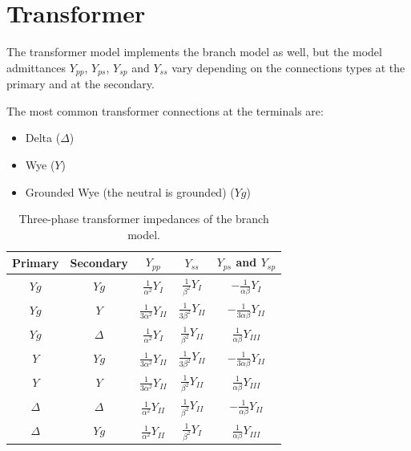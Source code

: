 \documentclass{tufte-book}
\begin{document}
\newpage
\section{Transformer}

The transformer model implements the branch model as well, but the model admittances $Y_{pp}$, $Y_{ps}$, $Y_{sp}$ and $Y_{ss}$ vary depending on the connections types at the primary and at the secondary.

The most common transformer connections at the terminals are:

\begin{itemize}
\item Delta ($\Delta$)
\item Wye ($Y$)
\item Grounded Wye (the neutral is grounded) ($Yg$)
\end{itemize}




\begin{table}[h!]
\begin{center}
\begin{tabular}{ccccc}
\toprule
Primary & Secondary & $Y_{pp}$  & $Y_{ss}$ & $Y_{ps}$ and $Y_{sp}$\\
\midrule
 $Yg$ & $Yg$ 			& $\frac{1}{\alpha^2}Y_I$ 				& $\frac{1}{\beta^2}Y_I$ 		& $-\frac{1}{\alpha\beta}Y_I$\\
 $Yg$ & $Y$ 			& $\frac{1}{3\alpha^2}Y_{II}$			& $\frac{1}{3\beta^2}Y_{II}$	& $-\frac{1}{3\alpha\beta}Y_{II}$	\\
 $Yg$ & $\Delta$  		& $\frac{1}{\alpha^2}Y_I$ 				& $\frac{1}{\beta^2}Y_{II}$ 	& $\frac{1}{\alpha\beta}Y_{III}$	 \\
 $Y$ & $Yg$ 			& $\frac{1}{3\alpha^2}Y_{II}$			& $\frac{1}{3\beta^2}Y_{II}$	& $-\frac{1}{3\alpha\beta}Y_{II}$ \\
 $Y$ & $Y$  			& $\frac{1}{3\alpha^2}Y_{II}$			& $\frac{1}{\beta^2}Y_{II}$ 	& $\frac{1}{\alpha\beta}Y_{III}$	 \\
 $\Delta$ & $\Delta$ 	& $\frac{1}{\alpha^2}Y_{II}$			& $\frac{1}{\beta^2}Y_{II}$		& $-\frac{1}{\alpha\beta}Y_{II}$\\
 $\Delta$ & $Yg$ 		& $\frac{1}{\alpha^2}Y_{II}$			& $\frac{1}{\beta^2}Y_{I}$		& $\frac{1}{\alpha\beta}Y_{III}$\\
\bottomrule
\end{tabular}
\end{center}
  \caption{Three-phase transformer impedances of the branch model.}
  \label{transfoemer_impedances_table}
\end{table}
\end{document}
